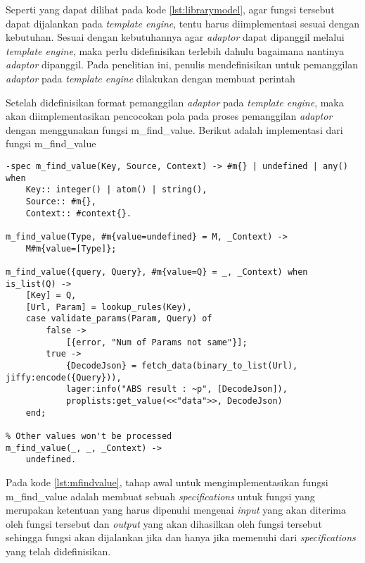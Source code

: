 Seperti yang dapat dilihat pada kode \ref{lst:librarymodel}, agar fungsi tersebut dapat dijalankan pada \textit{template engine}, tentu harus diimplementasi sesuai dengan kebutuhan. Sesuai dengan kebutuhannya agar \textit{adaptor} dapat dipanggil melalui \textit{template engine}, maka perlu didefinisikan terlebih dahulu bagaimana nantinya \textit{adaptor} dipanggil. Pada penelitian ini, penulis mendefinisikan untuk pemanggilan \textit{adaptor} pada \textit{template engine} dilakukan dengan membuat perintah 

Setelah didefinisikan format pemanggilan \textit{adaptor} pada \textit{template engine}, maka akan diimplementasikan pencocokan pola pada proses pemanggilan \textit{adaptor} dengan menggunakan fungsi m\_find\_value. Berikut adalah implementasi dari fungsi m\_find\_value

\begin{minipage}{\linewidth}
\begin{lstlisting}[caption={Implementasi fungsi m find value},label={lst:mfindvalue}]
% this method to handle call api from template
-spec m_find_value(Key, Source, Context) -> #m{} | undefined | any() when
    Key:: integer() | atom() | string(),
    Source:: #m{},
    Context:: #context{}.

m_find_value(Type, #m{value=undefined} = M, _Context) ->
    M#m{value=[Type]};

m_find_value({query, Query}, #m{value=Q} = _, _Context) when is_list(Q) ->
	[Key] = Q,
	[Url, Param] = lookup_rules(Key),
	case validate_params(Param, Query) of
		false ->
			[{error, "Num of Params not same"}];
		true ->
			{DecodeJson} = fetch_data(binary_to_list(Url), jiffy:encode({Query})),
			lager:info("ABS result : ~p", [DecodeJson]),
			proplists:get_value(<<"data">>, DecodeJson)
	end;

% Other values won't be processed
m_find_value(_, _, _Context) ->
    undefined. 
\end{lstlisting}
\end{minipage}

Pada kode \ref{lst:mfindvalue}, tahap awal untuk mengimplementasikan fungsi m\_find\_value adalah membuat sebuah \textit{specifications} untuk fungsi yang merupakan ketentuan yang harus dipenuhi mengenai \textit{input} yang akan diterima oleh fungsi tersebut dan \textit{output} yang akan dihasilkan oleh fungsi tersebut sehingga fungsi akan dijalankan jika dan hanya jika memenuhi dari \textit{specifications} yang telah didefinisikan.

